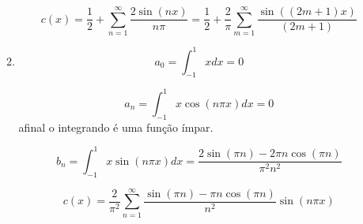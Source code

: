 \documentclass{article}
\begin{document}
\begin{enumerate}
\begin{enumerate}
                        $$c(x) = \dfrac{1}{2} + \sum_{n=1}^\infty \dfrac{2\sin(nx)}{n\pi}
                        = \dfrac{1}{2} + \dfrac{2}{\pi}\sum_{m=1}^\infty \dfrac{\sin((2m+1)x)}{(2m+1)}$$

                    \item
                        $$a_0 = \int_{-1}^{1}x dx = 0$$
                        
                        $$a_n = \int_{-1}^{1} x\cos(n\pi x) dx = 0$$
                        afinal o integrando é uma função ímpar.

                        $$b_n = \int_{-1}^{1} x \sin(n\pi x) dx = \dfrac{2 \sin(\pi n) - 2 \pi n \cos(\pi n)}{\pi^2n^2}$$

                        $$c(x) = \dfrac{2}{\pi^2} \sum_{n=1}^{\infty} \dfrac{\sin(\pi n) - \pi n \cos(\pi n)}{n^2} \sin(n\pi x)$$
                \end{enumerate}
        \end{enumerate}

    \newpage

    \appendix
\end{document}
